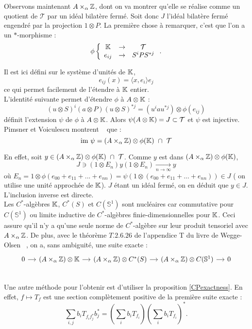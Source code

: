 Observons maintenant $A\times_\alpha \mathbb Z$, dont on va montrer qu'elle se réalise comme un quotient de $\mathcal T$ par un idéal bilatère fermé. Soit donc $J$ l'idéal bilatère fermé engendré par la projection $1\otimes P$. La première chose à remarquer, c'est que l'on a un $*$-morphisme :
\[\phi \left\{\begin{array}{ccc}\mathbb K & \rightarrow & \mathcal T\\
				e_{ij} & \rightarrow & S^i P S^{*j}\end{array}\right. .\]

Il est ici défini sur le système d'unités de $\mathbb K$, 
\[e_{ij}(x)=\langle x,e_i\rangle e_j\]
ce qui permet facilement de l'étendre à $\mathbb K$ entier. \\

L'identité suivante permet d'étendre $\phi$ à $A\otimes \mathbb K$ :
\[(u\otimes S)^i (a\otimes P) (u\otimes S)^{*j}=(u^i a u^{*j}) \otimes \phi (e_{ij})\]
définit l'extension $\psi$ de $\phi$ à $A\otimes \mathbb K$. Alors $\psi(A\otimes \mathbb K)=J\subset \mathcal T$ et $\psi $ est injective.\\

Pimsner et Voiculescu montrent ~\cite{PV} que :
\begin{equation}
\text{im} \ \psi = (A\times _ \alpha \Z )\otimes \phi(\K) \ \cap \ \mathcal T
\label{image}
\end{equation}

En effet, soit $y\in (A\times _ \alpha \mathbb Z )\otimes \phi(\mathbb K) \ \cap \ \mathcal T$. Comme $y$ est dans $(A\times _ \alpha \mathbb Z )\otimes \phi(\mathbb K) $,
\[J \ni (1\otimes E_n) y (1\otimes E_n) \underset{n \rightarrow \infty}{\longrightarrow} y \]
où $E_n = 1\otimes\phi(e_{00}+e_{11}+...+e_{nn})=\psi (1\otimes(e_{00}+e_{11}+...+e_{nn}) )\in J$ ( on utilise une unité approchée de $\mathbb K$). $J$ étant un idéal fermé, on en déduit que $y\in J$. L'inclusion inverse est directe.\\

Les $C^*$-algèbres $\mathbb K$, $C^*(S)$ et $C(\mathbb S^1)$ sont nucléaires car commutative pour $C(\mathbb S^1)$ ou limite inductive de $C^*$-algèbres finie-dimensionnelles pour $\mathbb K$. %
Ceci assure qu'il n'y a qu'une seule norme de  $C^*$-algèbre sur leur produit tensoriel avec $A\times _\alpha \mathbb Z$. De plus, avec le théorème $T.2.6.26$ de l'appendice T du livre de Wegge-Olsen ~\cite{WeggeOlsen}, on a, sans ambiguité, une suite exacte :
\[\begin{tikzcd}[column sep=small]
0 \arrow{r} & (A\times _\alpha \Z)\otimes \K \arrow{r} &  (A\times _\alpha \Z)\otimes C^*(S) \arrow{r}  &  (A\times _\alpha \Z) \otimes C(\mathbb S^1) \arrow{r} & 0 \\ 
\end{tikzcd}\] 
Une autre méthode pour l'obtenir est d'utiliser la proposition \ref{CPexactness}. En effet, $f\mapsto T_f$ est une section complètement positive de la première suite exacte :
\[\sum_{i,j} b_i T_{f_i f_j^*} b_j^*= (\sum_i b_i T_{f_i})(\sum_i b_i T_{f_i})^*.\]

